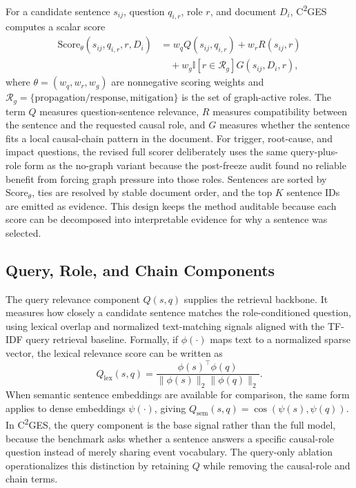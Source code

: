 \documentclass{ieeeaccess}
\begin{document}
For a candidate sentence \(s_{ij}\), question \(q_{i,r}\), role \(r\), and document \(D_i\), C\textsuperscript{2}GES computes a scalar score
\[
\begin{aligned}
\mathrm{Score}_{\theta}(s_{ij},q_{i,r},r,D_i)
&=
w_q Q(s_{ij},q_{i,r})
+
w_r R(s_{ij},r)\\
&\quad+
w_g \mathbb{I}[r\in\mathcal{R}_g]G(s_{ij},D_i,r),
\end{aligned}
\]
where \(\theta=(w_q,w_r,w_g)\) are nonnegative scoring weights and \(\mathcal{R}_g=\{\text{propagation/response},\text{mitigation}\}\) is the set of graph-active roles. The term \(Q\) measures question-sentence relevance, \(R\) measures compatibility between the sentence and the requested causal role, and \(G\) measures whether the sentence fits a local causal-chain pattern in the document. For trigger, root-cause, and impact questions, the revised full scorer deliberately uses the same query-plus-role form as the no-graph variant because the post-freeze audit found no reliable benefit from forcing graph pressure into those roles. Sentences are sorted by \(\mathrm{Score}_{\theta}\), ties are resolved by stable document order, and the top \(K\) sentence IDs are emitted as evidence. This design keeps the method auditable because each score can be decomposed into interpretable evidence for why a sentence was selected.

\subsection{Query, Role, and Chain Components}

\label{sec:query_role_and_chain_components}

The query relevance component \(Q(s,q)\) supplies the retrieval backbone. It measures how closely a candidate sentence matches the role-conditioned question, using lexical overlap and normalized text-matching signals aligned with the TF-IDF query retrieval baseline. Formally, if \(\phi(\cdot)\) maps text to a normalized sparse vector, the lexical relevance score can be written as
\[
Q_{\mathrm{lex}}(s,q)=
\frac{\phi(s)^\top \phi(q)}
{\|\phi(s)\|_2\|\phi(q)\|_2}.
\]
When semantic sentence embeddings are available for comparison, the same form applies to dense embeddings \(\psi(\cdot)\), giving \(Q_{\mathrm{sem}}(s,q)=\cos(\psi(s),\psi(q))\). In C\textsuperscript{2}GES, the query component is the base signal rather than the full model, because the benchmark asks whether a sentence answers a specific causal-role question instead of merely sharing event vocabulary. The query-only ablation operationalizes this distinction by retaining \(Q\) while removing the causal-role and chain terms.
\end{document}
